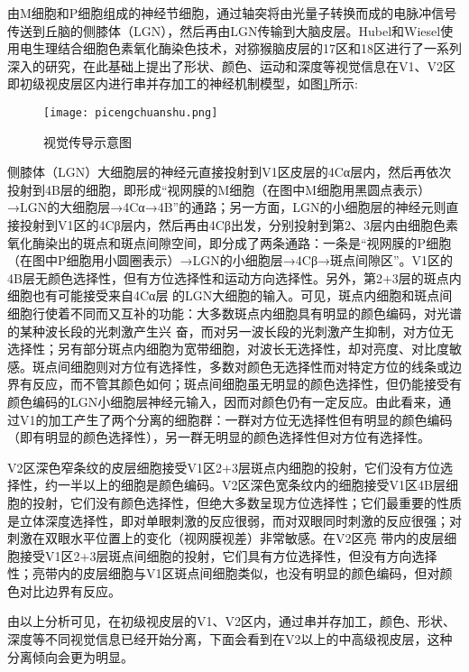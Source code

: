 \documentclass[a4paper,10pt]{article}\large
\begin{document}
由M细胞和P细胞组成的神经节细胞，通过轴突将由光量子转换而成的电脉冲信号传送到丘脑的侧膝体（LGN），然后再由LGN传输到大脑皮层。Hubel和Wiesel使用电生理结合细胞色素氧化酶染色技术，对猕猴脑皮层的17区和18区进行了一系列深入的研究，在此基础上提出了形状、颜色、运动和深度等视觉信息在V1、V2区即初级视皮层区内进行串并存加工的神经机制模型，如图\ref{fig 10}所示:


\begin{figure}[htb]
\centering
\texttt{[image: picengchuanshu.png]}
\caption{视觉传导示意图}\label{fig 10} 
\end{figure}




侧膝体（LGN）大细胞层的神经元直接投射到V1区皮层的4Cα层内，然后再依次投射到4B层的细胞，即形成“视网膜的M细胞（在图中M细胞用黑圆点表示）→LGN的大细胞层→4Cα→4B”的通路；另一方面，LGN的小细胞层的神经元则直接投射到V1区的4Cβ层内，然后再由4Cβ出发，分别投射到第2、3层内由细胞色素氧化酶染出的斑点和斑点间隙空间，即分成了两条通路：一条是“视网膜的P细胞（在图中P细胞用小圆圈表示）→LGN的小细胞层→4Cβ→斑点间隙区”。V1区的4B层无颜色选择性，但有方位选择性和运动方向选择性\cite{15:book}。另外，第2+3层的斑点内细胞也有可能接受来自4Cα层 的LGN大细胞的输入。可见，斑点内细胞和斑点间细胞行使着不同而又互补的功能：大多数斑点内细胞具有明显的颜色编码，对光谱的某种波长段的光刺激产生兴 奋，而对另一波长段的光刺激产生抑制，对方位无选择性；另有部分斑点内细胞为宽带细胞，对波长无选择性，却对亮度、对比度敏感。斑点间细胞则对方位有选择性，多数对颜色无选择性而对特定方位的线条或边界有反应，而不管其颜色如何；斑点间细胞虽无明显的颜色选择性，但仍能接受有颜色编码的LGN小细胞层神经元输入，因而对颜色仍有一定反应。由此看来，通过V1的加工产生了两个分离的细胞群：一群对方位无选择性但有明显的颜色编码（即有明显的颜色选择性），另一群无明显的颜色选择性但对方位有选择性\cite{14:misc}。
         


V2区深色窄条纹的皮层细胞接受V1区2+3层斑点内细胞的投射，它们没有方位选择性，约一半以上的细胞是颜色编码。V2区深色宽条纹内的细胞接受V1区4B层细胞的投射，它们没有颜色选择性，但绝大多数呈现方位选择性；它们最重要的性质是立体深度选择性，即对单眼刺激的反应很弱，而对双眼同时刺激的反应很强；对刺激在双眼水平位置上的变化（视网膜视差）非常敏感。在V2区亮 带内的皮层细胞接受V1区2+3层斑点间细胞的投射，它们具有方位选择性，但没有方向选择性；亮带内的皮层细胞与V1区斑点间细胞类似，也没有明显的颜色编码，但对颜色对比边界有反应。
        


由以上分析可见，在初级视皮层的V1、V2区内，通过串并存加工，颜色、形状、深度等不同视觉信息已经开始分离，下面会看到在V2以上的中高级视皮层，这种分离倾向会更为明显。
        
\end{document}
